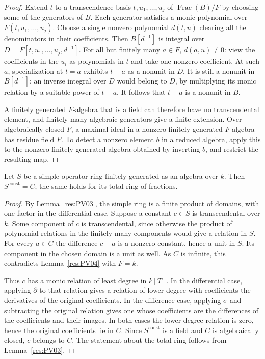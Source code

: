 \begin{proof}
Extend \(t\) to a transcendence basis \(t,u_1,\dots,u_j\) of
\(\operatorname{Frac}(B)/F\) by choosing some of the generators of
\(B\). Each generator satisfies a monic polynomial over
\(F(t,u_1,\dots,u_j)\). Choose a single nonzero polynomial \(d(t,u)\)
clearing all the denominators in their coefficients. Then
\(B[d^{-1}]\) is integral over
\(D=F[t,u_1,\dots,u_j,d^{-1}]\).
For all but finitely many \(a\in F\), \(d(a,u)\ne0\):
view the coefficients in the \(u_i\) as polynomials in \(t\) and take
one nonzero coefficient. At such \(a\), specialization at \(t=a\)
exhibits \(t-a\) as a nonunit in \(D\). It is still a nonunit in
\(B[d^{-1}]\): an inverse integral over \(D\) would belong to \(D\),
by multiplying its monic relation by a suitable power of \(t-a\).
It follows that \(t-a\) is a nonunit in \(B\).

A finitely generated \(F\)-algebra that is a field can therefore
have no transcendental element, and finitely many algebraic
generators give a finite extension. Over algebraically closed \(F\),
a maximal ideal in a nonzero finitely generated \(F\)-algebra has
residue field \(F\). To detect a nonzero element \(b\) in a reduced
algebra, apply this to the nonzero finitely generated algebra
obtained by inverting \(b\), and restrict the resulting map.
\end{proof}

\begin{proposition}
\label{res:PV05}
Let \(S\) be a simple operator ring finitely generated as an algebra
over \(k\). Then \(S^{\mathrm{const}}=C\); the same holds for
its total ring of fractions.
\end{proposition}

\begin{proof}
By Lemma~\ref{res:PV03}, the simple ring is a finite product of
domains, with one factor in the differential case. Suppose a
constant \(c\in S\) is transcendental over \(k\). Some component
of \(c\) is transcendental, since otherwise the product of
polynomial relations in the finitely many components would give a
relation in \(S\). For every \(a\in C\) the difference \(c-a\) is a
nonzero constant, hence a unit in \(S\). Its component in the
chosen domain is a unit as well. As \(C\) is infinite, this
contradicts Lemma~\ref{res:PV04} with \(F=k\).

Thus \(c\) has a monic relation of least degree in \(k[T]\).
In the differential case, applying \(\partial\) to that relation
gives a relation of lower degree with coefficients the derivatives of
the original coefficients. In the difference case, applying
\(\sigma\) and subtracting the original relation gives one whose
coefficients are the differences of the coefficients and their
images. In both cases the lower-degree relation is zero, hence the
original coefficients lie in \(C\). Since \(S^{\mathrm{const}}\)
is a field and \(C\) is algebraically closed, \(c\) belongs to
\(C\). The statement about the total ring follows from
Lemma~\ref{res:PV03}.
\end{proof}

